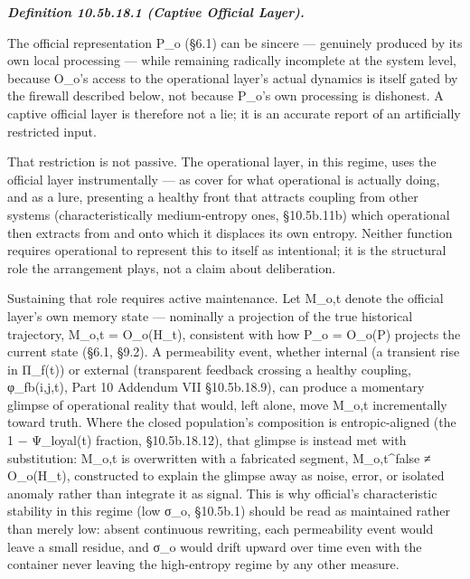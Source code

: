 \documentclass[
]{article}
\begin{document}
\emph{\textbf{Definition 10.5b.18.1 (Captive Official Layer).}}

The official representation P\_o (§6.1) can be sincere --- genuinely
produced by its own local processing --- while remaining radically
incomplete at the system level, because O\_o's access to the operational
layer's actual dynamics is itself gated by the firewall described below,
not because P\_o's own processing is dishonest. A captive official layer
is therefore not a lie; it is an accurate report of an artificially
restricted input.

That restriction is not passive. The operational layer, in this regime,
uses the official layer instrumentally --- as cover for what operational
is actually doing, and as a lure, presenting a healthy front that
attracts coupling from other systems (characteristically medium-entropy
ones, §10.5b.11b) which operational then extracts from and onto which it
displaces its own entropy. Neither function requires operational to
represent this to itself as intentional; it is the structural role the
arrangement plays, not a claim about deliberation.

Sustaining that role requires active maintenance. Let M\_o,t denote the
official layer's own memory state --- nominally a projection of the true
historical trajectory, M\_o,t = O\_o(H\_t), consistent with how P\_o =
O\_o(P) projects the current state (§6.1, §9.2). A permeability event,
whether internal (a transient rise in Π\_f(t)) or external (transparent
feedback crossing a healthy coupling, φ\_fb(i,j,t), Part 10 Addendum VII
§10.5b.18.9), can produce a momentary glimpse of operational reality
that would, left alone, move M\_o,t incrementally toward truth. Where
the closed population's composition is entropic-aligned (the 1 −
Ψ\_loyal(t) fraction, §10.5b.18.12), that glimpse is instead met with
substitution: M\_o,t is overwritten with a fabricated segment,
M\_o,t\^{}false ≠ O\_o(H\_t), constructed to explain the glimpse away as
noise, error, or isolated anomaly rather than integrate it as signal.
This is why official's characteristic stability in this regime (low
σ\_o, §10.5b.1) should be read as maintained rather than merely low:
absent continuous rewriting, each permeability event would leave a small
residue, and σ\_o would drift upward over time even with the container
never leaving the high-entropy regime by any other measure.
\end{document}

